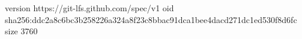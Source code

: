 version https://git-lfs.github.com/spec/v1
oid sha256:ddc2a8c6bc3b258226a324a8f23c8bbac91dca1bee4dacd271dc1ed530f8d6fc
size 3760
